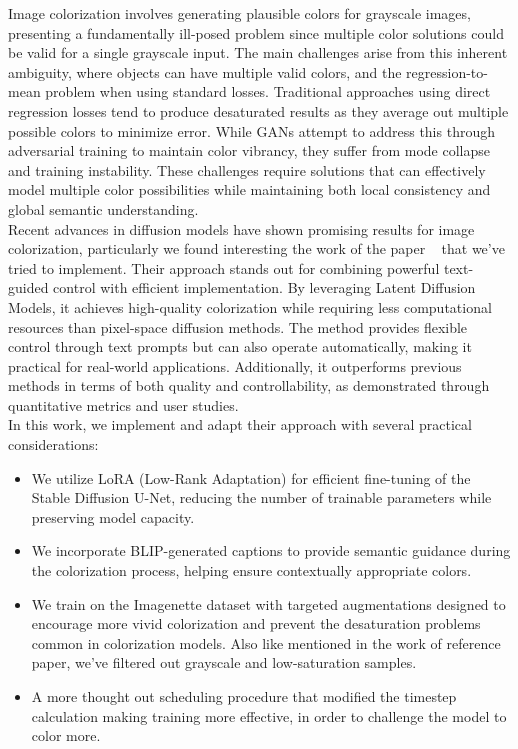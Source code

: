 \documentclass[10pt,twocolumn,letterpaper]{article}
\begin{document}
Image colorization involves generating plausible colors for grayscale images, presenting a fundamentally ill-posed problem since multiple color solutions could be valid for a single grayscale input. The main challenges arise from this inherent ambiguity, where objects can have multiple valid colors, and the regression-to-mean problem when using standard losses. Traditional approaches using direct regression losses tend to produce desaturated results as they average out multiple possible colors to minimize error. While GANs attempt to address this through adversarial training to maintain color vibrancy, they suffer from mode collapse and training instability. These challenges require solutions that can effectively model multiple color possibilities while maintaining both local consistency and global semantic understanding. \\
\indent Recent advances in diffusion models have shown promising results for image colorization, particularly we found interesting the work of the paper ~\cite{ReferencePaper} that we’ve tried to implement. Their approach stands out for combining powerful text-guided control with efficient implementation. By leveraging Latent Diffusion Models, it achieves high-quality colorization while requiring less computational resources than pixel-space diffusion methods. The method provides flexible control through text prompts but can also operate automatically, making it practical for real-world applications. Additionally, it outperforms previous methods in terms of both quality and controllability, as demonstrated through quantitative metrics and user studies.
\\
\indent 
In this work, we implement and adapt their approach with several practical considerations:
\begin{itemize}
\item We utilize LoRA (Low-Rank Adaptation) for efficient fine-tuning of the Stable Diffusion U-Net, reducing the number of trainable parameters while preserving model capacity.
\item We incorporate BLIP-generated captions to provide semantic guidance during the colorization process, helping ensure contextually appropriate colors.
\item We train on the Imagenette dataset with targeted augmentations designed to encourage more vivid colorization and prevent the desaturation problems common in colorization models. Also like mentioned in the work of reference paper, we’ve filtered out grayscale and low-saturation samples.
\item A more thought out scheduling procedure that modified the timestep calculation making training more effective, in order to challenge the model to color more.

\end{itemize}	
\end{document}
